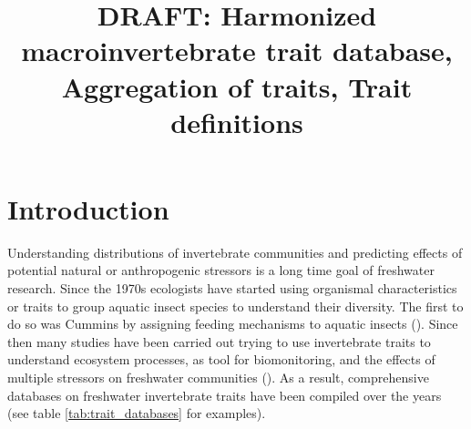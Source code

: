 \documentclass{article}
\title{ DRAFT: Harmonized macroinvertebrate trait database, Aggregation of traits, Trait definitions }
\author{}%
\date{}%
\begin{document}
\maketitle

\section{Introduction}

Understanding distributions of invertebrate communities and predicting effects of potential natural or anthropogenic stressors is a long time goal of freshwater research. Since the 1970s ecologists have started using organismal characteristics or traits to group aquatic insect species to understand their diversity. The first to do so was Cummins by assigning feeding mechanisms to aquatic insects (\cite{cummins_trophic_1973}). Since then many studies have been carried out trying to use invertebrate traits to understand ecosystem processes, as tool for biomonitoring, and the effects of multiple stressors on freshwater communities (\cite{statzner_can_2010, menezes_beyond_2010}). 
As a result, comprehensive databases on freshwater invertebrate traits have been compiled over the years (see table \ref{tab:trait_databases} for examples).
\end{document}
